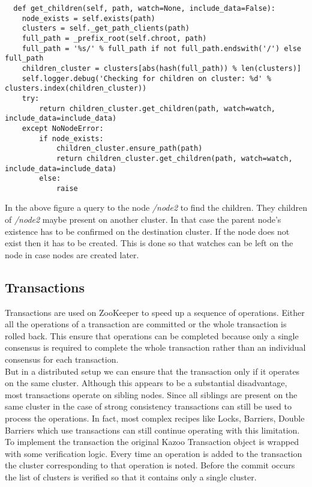\begin{lstlisting}
  def get_children(self, path, watch=None, include_data=False):
    node_exists = self.exists(path)
    clusters = self._get_path_clients(path)
    full_path = _prefix_root(self.chroot, path)
    full_path = '%s/' % full_path if not full_path.endswith('/') else full_path
    children_cluster = clusters[abs(hash(full_path)) % len(clusters)]
    self.logger.debug('Checking for children on cluster: %d' % clusters.index(children_cluster))
    try:
        return children_cluster.get_children(path, watch=watch, include_data=include_data)
    except NoNodeError:
        if node_exists:
            children_cluster.ensure_path(path)
            return children_cluster.get_children(path, watch=watch, include_data=include_data)
        else:
            raise
\end{lstlisting}



In the above figure a query to the node \textit{/node2} to find the children. They children of \textit{/node2} maybe present on another cluster. In that case the parent node's existence has to be confirmed on the destination cluster. If the node does not exist then it has to be created. This is done so that watches can be left on the node in case nodes are created later.

\subsection{Transactions}
Transactions are used on ZooKeeper to speed up a sequence of operations. Either all the operations of a transaction are committed or the whole transaction is rolled back. This ensure that operations can be completed because only a single consensus is required to complete the whole transaction rather than an individual consensus for each transaction.\\
    But in a distributed setup we can ensure that the transaction only if it operates on the same cluster. Although this appears to be a substantial disadvantage, most transactions operate on sibling nodes. Since all siblings are present on the same cluster in the case of strong consistency transactions can still be used to process the operations. In fact, most complex recipes like Locks, Barriers, Double Barriers which use transactions can still continue operating with this limitation.
    To implement the transaction the original Kazoo Transaction object is wrapped with some verification logic. Every time an operation is added to the transaction the cluster corresponding to that operation is noted. Before the commit occurs the list of clusters is verified so that it contains only a single cluster.
    
